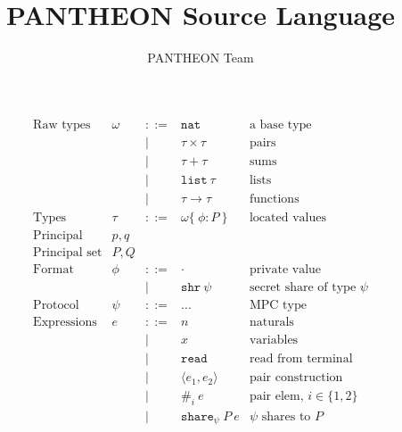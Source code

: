 \documentclass[10pt]{article}
\title{PANTHEON Source Language}
\author{PANTHEON Team}
\newcommand{\kw}[1]{\ensuremath{\mathtt{#1}}}
\newcommand{\tnat}{\ensuremath{\mathtt{nat}}}
\newcommand{\tlist}[1]{\ensuremath{\mathtt{list}~{#1}}}
\newcommand{\tfun}[2]{\ensuremath{{#1} \rightarrow {#2}}}
\newcommand{\tprod}[2]{\ensuremath{{#1} \times {#2}}}
\newcommand{\tsum}[2]{\ensuremath{{#1} + {#2}}}
\newcommand{\ssec}{\ensuremath{\mathtt{\cdot}}}
\newcommand{\isec}{\ensuremath{\mathtt{pmap}}}
\newcommand{\sshare}[1]{\ensuremath{\mathtt{shr}~{#1}}}
\newcommand{\sectyp}[3]{\ensuremath{{#1} \{~{#2}:{#3}~\}}}
\newcommand{\eshare}[3]{\ensuremath{\kw{share}_{#1}~{#2}~{#3}}}
\newcommand{\econcat}[2]{\ensuremath{{#1} +\!\!+~ {#2}}}
\newcommand{\eaccval}[2]{\ensuremath{{#1}.{#2}}}
\newcommand{\eread}{\ensuremath{\kw{read}}}
\newcommand{\epair}[2]{\ensuremath{\langle {#1}, {#2} \rangle}}
\newcommand{\eproj}[2]{\ensuremath{\kw{\#}}_{#1}~{#2}}
\begin{document}
\maketitle

\begin{figure}[h]
  \centering
  \[\begin{array}{rlcll}
      \text{Raw types} & \omega  & ::=  & \tnat & \text{a base type} \\      
                       && \mid & \tprod{\tau}{\tau} & \text{pairs} \\
                       && \mid & \tsum{\tau}{\tau} & \text{sums} \\
                       && \mid & \tlist{\tau} & \text{lists} \\
                       && \mid & \tfun{\tau}{\tau} & \text{functions} \\
      \text{Types} & \tau & ::= &
                                 \sectyp\omega\phi{P} & \text{located values} \\
      \text{Principal} & p, q \\
      \text{Principal set} & P, Q \\
      \text{Format} & \phi & ::= & \ssec & \text{private value}  \\
                       && \mid & \sshare{\psi} & \text{secret share of type $\psi$} \\
      \text{Protocol} & \psi & ::= & ... & \text{MPC type} \\
      \text{Expressions} & e & ::= & n & \text{naturals} \\
                       && \mid & x & \text{variables} \\
                       && \mid & \eread & \text{read from terminal}\\
                       && \mid & \epair{e_1}{e_2} & \text{pair construction}\\
                       && \mid & \eproj{i}{e} & \text{pair elem, }i \in \{1,2\}\\
                       && \mid & \eshare{\psi}{P}{e} & \text{$\psi$ shares to $P$} \\

\end{array}\]
\end{figure}
\end{document}
